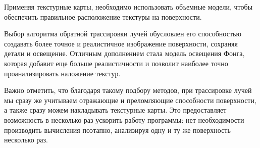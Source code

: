 Применяя текстурные карты, необходимо использовать объемные модели,
чтобы обеспечить правильное расположение текстуры на поверхности.

Выбор алгоритма обратной трассировки лучей обусловлен его способностью создавать более точное и реалистичное изображение поверхности, сохраняя детали и освещение. Отличным дополнением стала модель освещения Фонга, которая добавит еще больше реалистичности и позволит наиболее точно проанализировать наложение текстур.

Важно отметить, что благодаря такому подбору методов, при трассировке лучей мы сразу же учитываем отражающие и преломляющие способности поверхности, а также сразу можем накладывать текстурные карты. Это предоставляет возможность в несколько раз ускорить работу программы: нет необходимости производить вычисления поэтапно, анализируя одну и ту же поверхность несколько раз.
